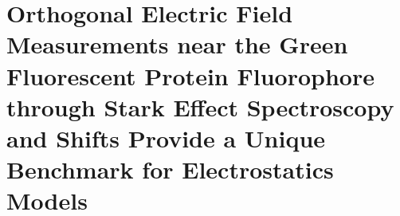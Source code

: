 \chapter{Orthogonal Electric Field Measurements near the Green Fluorescent Protein Fluorophore through Stark Effect Spectroscopy and \pKa{} Shifts Provide a Unique Benchmark for Electrostatics Models} \label{gfp-pKa}


